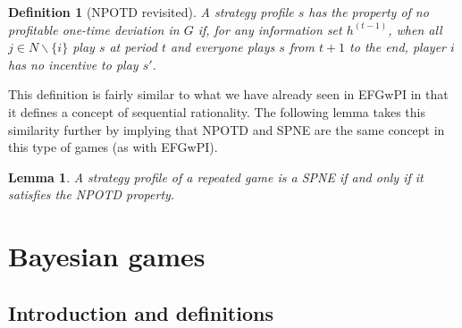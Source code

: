 \documentclass[12pt]{report}
\newtheorem{definition}{Definition}[chapter]
\newtheorem{lemma}{Lemma}[chapter]
\begin{document}
\begin{definition}[NPOTD revisited]
A strategy profile $s$ has the property of no profitable one-time deviation in $G$ if, for any information set $h^{(t-1)}$, when all $j\in N\backslash\{i\}$ play $s$ at period $t$ and everyone plays $s$ from $t+1$ to the end, player $i$ has no incentive to play $s'$.
\end{definition}

This definition is fairly similar to what we have already seen in EFGwPI in that it defines a concept of sequential rationality. The following lemma takes this similarity further by implying that NPOTD and SPNE are the same concept in this type of games (as with EFGwPI).

\begin{lemma}
A strategy profile of a repeated game is a SPNE if and only if it satisfies the NPOTD property.
\end{lemma}


\section{Bayesian games}

\subsection{Introduction and definitions}
\end{document}
